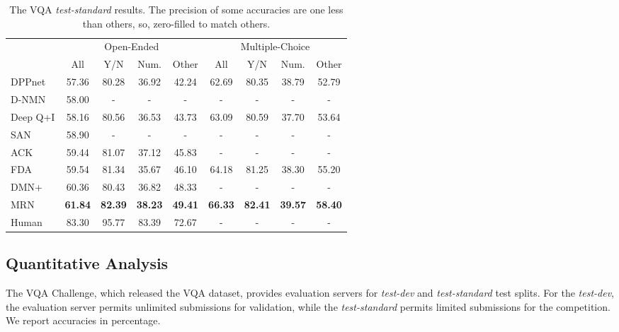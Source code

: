 \documentclass{article}
\begin{document}
\begin{table}[t!]
\caption{The VQA \textit{test-standard} results. The precision of some accuracies \cite{Yang2015,Andreas2016} are one less than others, so, zero-filled to match others.}
\label{tab:results-std}
\centering
\begin{tabular}{l c c c c c c c c}
\toprule
& \multicolumn{4}{c}{Open-Ended} & \multicolumn{4}{c}{ Multiple-Choice} \\
\cmidrule{2-5}
\cmidrule{6-9}
 & All & Y/N & Num. & Other & All & Y/N & Num. & Other \\
\midrule
DPPnet \cite{Noh2015} \hspace{7pt}
         & 57.36 & 80.28 & 36.92 & 42.24
         & 62.69 & 80.35 & 38.79 & 52.79 \\
D-NMN \cite{Andreas2016}
         & 58.00 & - & - & -
         & - & - & - & - \\
Deep Q+I \cite{Lu2015} \hspace{6pt}
         & 58.16 & 80.56 & 36.53 & 43.73 
         & 63.09 & 80.59 & 37.70 & 53.64 \\
SAN   \cite{Yang2015}
         & 58.90 & - & - & -
         & - & - & - & - \\
ACK   \cite{Wu2016}
         & 59.44 & 81.07 & 37.12 & 45.83
         & - & - & - & - \\
FDA   \cite{Ilievski2016}
         & 59.54 & 81.34 & 35.67 & 46.10
         & 64.18 & 81.25 & 38.30 & 55.20  \\
DMN+ \cite{Xiong2016}
         & 60.36 & 80.43 & 36.82 & 48.33
         & - & - & - & - \\
\midrule
MRN 
         & \textbf{61.84} & \textbf{82.39} & \textbf{38.23} & \textbf{49.41}
         & \textbf{66.33} & \textbf{82.41} & \textbf{39.57} & \textbf{58.40} \\
\midrule
Human \cite{Antol2015} 
         & 83.30 & 95.77 & 83.39 & 72.67 
         & - & - & - & - \\
\bottomrule
\end{tabular}
\end{table}

\subsection{Quantitative Analysis}

The VQA Challenge, which released the VQA dataset, provides evaluation servers for \textit{test-dev} and \textit{test-standard} test splits. For the \textit{test-dev}, the evaluation server permits unlimited submissions for validation, while the \textit{test-standard} permits limited submissions for the competition. We report accuracies in percentage. 
\end{document}
